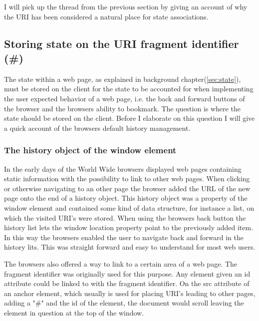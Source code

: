 \documentclass[english]{ifimaster}
\begin{document}
I will pick up the thread from the previous section by giving an account of why the URI has been considered a natural place for state associations.

\subsection{Storing state on the URI fragment identifier (\#)}
The state within a web page, as explained in background chapter(\ref{sec:state}), must be stored on the client for the state to be accounted for when implementing the user expected behavior of a web page, i.e. the back and forward buttons of the browser and the browsers ability to bookmark. The question is where the state should be stored on the client. Before I elaborate on this question I will give a quick account of the browsers default history management.%

\subsubsection{The history object of the window element}
In the early days of the World Wide browsers displayed web pages containing static information with the possibility to link to other web pages. When clicking or otherwise navigating to an other page the browser added the URL of the new page onto the end of a history object. This history object was a property of the window element and contained some kind of data structure, for instance a list, on which the visited URI's were stored. When using the browsers back button the history list lets the window location property point to the previously added item. In this way the browsers enabled the user to navigate back and forward in the history lits. This was straight forward and easy to understand for most web users.

The browsers also offered a way to link to a certain area of a web page. The fragment identifier was originally used for this purpose. Any element given an id attribute could be linked to with the fragment identifier. On the src attribute of an anchor element, which usually is used for placing URI's leading to other pages, adding a "\#" and the id of the element, the document would scroll leaving the element in question at the top of the window.
\end{document}
